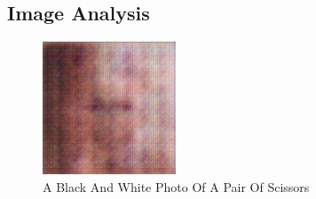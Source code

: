 \documentclass{article}%
\begin{document}
%
\subsection{Image Analysis}%
\label{subsec:ImageAnalysis}%


\begin{figure}[h!]%
\centering%
\includegraphics[width=150px]{500_fake_images/samples_5_330.png}%
\caption{A Black And White Photo Of A Pair Of Scissors}%
\end{figure}

%
\end{document}
